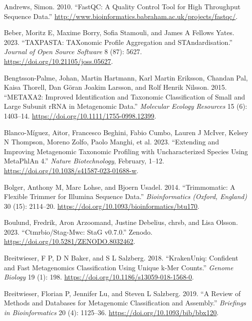 \documentclass[
]{article}
\newlength{\cslhangindent}
\newlength{\cslentryspacingunit} %
\newenvironment{CSLReferences}[2] %
 {%
  \setlength{\parindent}{0pt}
  \ifodd #1
  \let\oldpar\par
  \def\par{\hangindent=\cslhangindent\oldpar}
  \fi
  \setlength{\parskip}{#2\cslentryspacingunit}
 }%
 {}
\begin{document}
\hypertarget{refs}{}
\begin{CSLReferences}{1}{0}
\leavevmode{}%
Andrews, Simon. 2010. {``{FastQC}: A Quality Control Tool for High
Throughput Sequence Data.''}
\url{http://www.bioinformatics.babraham.ac.uk/projects/fastqc/}.

\leavevmode{}%
Beber, Moritz E, Maxime Borry, Sofia Stamouli, and James A Fellows
Yates. 2023. {``{TAXPASTA}: {TAXonomic} Profile Aggregation and
{STAndardisation}.''} \emph{Journal of Open Source Software} 8 (87):
5627. \url{https://doi.org/10.21105/joss.05627}.

\leavevmode{}%
Bengtsson-Palme, Johan, Martin Hartmann, Karl Martin Eriksson, Chandan
Pal, Kaisa Thorell, Dan Göran Joakim Larsson, and Rolf Henrik Nilsson.
2015. {``{METAXA2}: Improved Identification and Taxonomic Classification
of Small and Large Subunit {rRNA} in Metagenomic Data.''}
\emph{Molecular Ecology Resources} 15 (6): 1403--14.
\url{https://doi.org/10.1111/1755-0998.12399}.

\leavevmode{}%
Blanco-Míguez, Aitor, Francesco Beghini, Fabio Cumbo, Lauren J McIver,
Kelsey N Thompson, Moreno Zolfo, Paolo Manghi, et al. 2023. {``Extending
and Improving Metagenomic Taxonomic Profiling with Uncharacterized
Species Using {MetaPhlAn} 4.''} \emph{Nature Biotechnology}, February,
1--12. \url{https://doi.org/10.1038/s41587-023-01688-w}.

\leavevmode{}%
Bolger, Anthony M, Marc Lohse, and Bjoern Usadel. 2014. {``Trimmomatic:
A Flexible Trimmer for Illumina Sequence Data.''} \emph{Bioinformatics
(Oxford, England)} 30 (15): 2114--20.
\url{https://doi.org/10.1093/bioinformatics/btu170}.

\leavevmode{}%
Boulund, Fredrik, Aron Arzoomand, Justine Debelius, chrsb, and Lisa
Olsson. 2023. {``Ctmrbio/Stag-Mwc: {StaG} {v0}.7.0.''} Zenodo.
\url{https://doi.org/10.5281/ZENODO.8032462}.

\leavevmode{}%
Breitwieser, F P, D N Baker, and S L Salzberg. 2018. {``{KrakenUniq}:
Confident and Fast Metagenomics Classification Using Unique k-Mer
Counts.''} \emph{Genome Biology} 19 (1): 198.
\url{https://doi.org/10.1186/s13059-018-1568-0}.

\leavevmode{}%
Breitwieser, Florian P, Jennifer Lu, and Steven L Salzberg. 2019. {``A
Review of Methods and Databases for Metagenomic Classification and
Assembly.''} \emph{Briefings in Bioinformatics} 20 (4): 1125--36.
\url{https://doi.org/10.1093/bib/bbx120}.


\end{CSLReferences}
\end{document}
